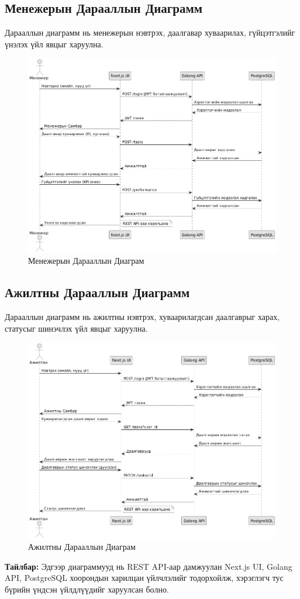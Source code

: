 \subsection*{Менежерын Дарааллын Диаграмм}
Дарааллын диаграмм нь менежерын нэвтрэх, даалгавар хуваарилах, гүйцэтгэлийг үнэлэх үйл явцыг харуулна.
\begin{figure}[H]
    \centering
    \includegraphics[width=\textwidth]{src/images/manager_seq.png}
    \caption{Менежерын Дарааллын Диаграм}
    \label{fig:manager_sequence_diagram}
\end{figure}

\subsection*{Ажилтны Дарааллын Диаграмм}
Дарааллын диаграмм нь ажилтны нэвтрэх, хуваарилагдсан даалгаврыг харах, статусыг шинэчлэх үйл явцыг харуулна.
\begin{figure}[H]
    \centering
    \includegraphics[width=\textwidth]{src/images/employee_seq.png}
    \caption{Ажилтны Дарааллын Диаграм}
    \label{fig:employee_sequence_diagram}
\end{figure}

\textbf{Тайлбар:} Эдгээр диаграммууд нь REST API-аар дамжуулан Next.js UI, Golang API, PostgreSQL хоорондын харилцан үйлчлэлийг тодорхойлж, хэрэглэгч тус бүрийн үндсэн үйлдлүүдийг харуулсан болно.